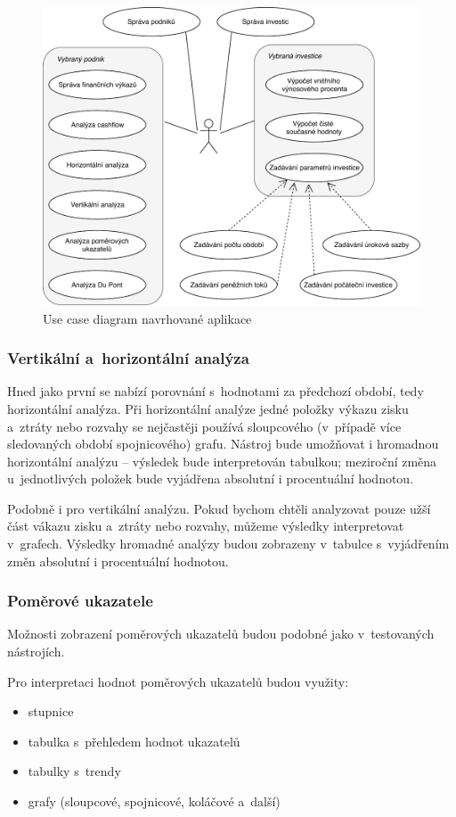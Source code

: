\begin{figure}[!htb]
  \centering
  \includegraphics[width=14cm]{img/ucd.pdf}
  \caption{Use case diagram navrhované aplikace}
\end{figure}


\subsubsection{Vertikální a~horizontální analýza}
Hned jako první se nabízí porovnání s~hodnotami za předchozí období, tedy horizontální analýza. Při horizontální analýze jedné položky výkazu zisku a~ztráty nebo rozvahy se nejčastěji používá sloupcového (v~případě více sledovaných období spojnicového) grafu. Nástroj bude umožňovat i hromadnou horizontální analýzu -- výsledek bude interpretován tabulkou; meziroční změna u~jednotlivých položek bude vyjádřena absolutní i procentuální hodnotou.

Podobně i pro vertikální analýzu. Pokud bychom chtěli analyzovat pouze užší část vákazu zisku a~ztráty nebo rozvahy, můžeme výsledky interpretovat v~grafech. Výsledky hromadné analýzy budou zobrazeny v~tabulce s~vyjádřením změn absolutní i procentuální hodnotou.

\subsubsection{Poměrové ukazatele}
Možnosti zobrazení poměrových ukazatelů budou podobné jako v~testovaných nástrojích. 

Pro interpretaci hodnot poměrových ukazatelů budou využity:
\begin{itemize}
	\item stupnice
	\item tabulka s~přehledem hodnot ukazatelů
	\item tabulky s~trendy
	\item grafy (sloupcové, spojnicové, koláčové a~další)
\end{itemize}

